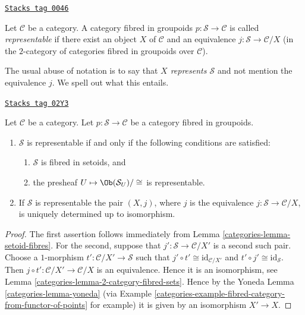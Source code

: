 \begin{definition}
\label{categories-definition-representable-fibred-category}
\href{https://stacks.math.columbia.edu/tag/0046}{\texttt{Stacks tag 0046}}

Let $\mathcal{C}$ be a category.
A category fibred in groupoids $p : \mathcal{S} \to \mathcal{C}$ is
called {\it representable} if there exist an object
$X$ of $\mathcal{C}$ and an equivalence $j : \mathcal{S} \to \mathcal{C}/X$
(in the $2$-category of categories fibred in groupoids over $\mathcal{C}$).
\end{definition}

The usual abuse of notation is to say that {\it $X$ represents $\mathcal{S}$}
and not mention the equivalence $j$. We spell out what this entails.

\begin{lemma}
\label{categories-lemma-characterize-representable-fibred-category}
\href{https://stacks.math.columbia.edu/tag/02Y3}{\texttt{Stacks tag 02Y3}}

Let $\mathcal{C}$ be a category.
Let $p : \mathcal{S} \to \mathcal{C}$ be a category fibred in groupoids.
\begin{enumerate}
\item $\mathcal{S}$ is representable if and only if
the following conditions are satisfied:
\begin{enumerate}
\item $\mathcal{S}$ is fibred in setoids, and
\item the presheaf $U \mapsto \Ob(\mathcal{S}_U)/\cong$ is
representable.
\end{enumerate}
\item If $\mathcal{S}$ is representable the pair $(X, j)$, where $j$ is the
equivalence $j : \mathcal{S} \to \mathcal{C}/X$, is uniquely determined
up to isomorphism.
\end{enumerate}
\end{lemma}

\begin{proof}

The first assertion follows immediately from
Lemma \ref{categories-lemma-setoid-fibres}.
For the second, suppose that $j' : \mathcal{S} \to \mathcal{C}/X'$ is
a second such pair. Choose a $1$-morphism
$t' : \mathcal{C}/X' \to \mathcal{S}$ such that
$j' \circ t' \cong \text{id}_{\mathcal{C}/X'}$ and
$t' \circ j' \cong \text{id}_\mathcal{S}$. Then
$j \circ t' : \mathcal{C}/X' \to \mathcal{C}/X$ is an equivalence.
Hence it is an isomorphism, see Lemma \ref{categories-lemma-2-category-fibred-sets}.
Hence by the Yoneda Lemma \ref{categories-lemma-yoneda} (via
Example \ref{categories-example-fibred-category-from-functor-of-points} for example)
it is given by an isomorphism $X' \to X$.
\end{proof}

